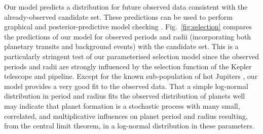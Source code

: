 \documentclass[apjl]{emulateapj}
\begin{document}
Our model predicts a distribution for future observed data consistent
with the already-observed candidate set.  These predictions can be
used to perform graphical and posterior-predictive model checking
\citep{Gelman2013}.  Fig.\ \ref{fig:selection} compares the
predictions of our model for observed periods and radii (incorporating
both planetary transits and background events) with the candidate set.
This is a particularly stringent test of our parameterised selection
model since the observed periods and radii are strongly influenced by
the selection function of the Kepler telescope and pipeline.  Except
for the known sub-population of hot Jupiters
\citep{Albrecht2012,Naoz2012}, our model provides a very good fit to
the observed data.  That a simple log-normal distribution in period
and radius fits the observed distribution of planets well may indicate
that planet formation is a stochastic process with many small,
correlated, and multiplicative influences on planet period and radius
resulting, from the central limit theorem, in a log-normal
distribution in these parameters.
\end{document}
